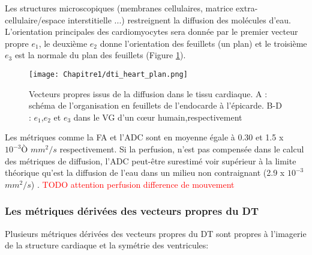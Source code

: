 Les structures microscopiques (membranes cellulaires, matrice extra-cellulaire/espace interstitielle ...) restreignent la diffusion des molécules d’eau. L’orientation principales des cardiomyocytes sera donnée par le premier vecteur propre $e_1$, le deuxième $e_2$ donne l’orientation des feuillets (un plan) et le troisième $e_3$ est la normale du plan des feuillets (Figure \ref{fig:dti_heart_plan}).

\begin{figure}[!h]
\begin{center}
  \texttt{[image: Chapitre1/dti\_heart\_plan.png]}
   \end{center}
  \caption{Vecteurs propres issus de la diffusion dans le tissu cardiaque. A : schéma de l’organisation en feuillets de l’endocarde à l’épicarde. B-D : $e_1$,$e_2$ et $e_3$ dans le VG d’un cœur humain,respectivement}
\label{fig:dti_heart_plan}
\end{figure}

Les métriques comme la FA et l’ADC sont en moyenne égale à 0.30 et 1.5 x $10^{-3}Ò$ $mm^2/s$ respectivement. Si la perfusion, n’est pas compensée dans le calcul des métriques de diffusion, l’ADC peut-être surestimé voir supérieur à la limite théorique qu’est la diffusion de l’eau dans un milieu non contraignant (2.9 x $10^{-3}$ $mm^2/s$) \cite{Moulin2023}.
\textcolor{red}{TODO attention perfusion difference de mouvement}

\subsubsection{Les métriques dérivées des vecteurs propres du DT}

Plusieurs métriques dérivées des vecteurs propres du DT sont propres à l'imagerie de la structure cardiaque et la symétrie des ventricules:

